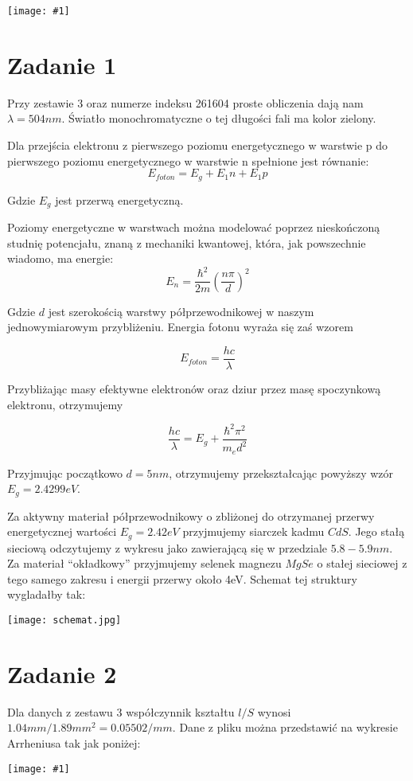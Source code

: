 \documentclass[11pt]{article}
\newcommand{\largepng}[1]{\begin{center}\texttt{[image: \#1]}\end{center}}
\begin{document}
\largepng{tabelka.png}
\section{Zadanie 1}

Przy zestawie 3 oraz numerze indeksu 261604 proste obliczenia dają nam $\lambda=504 nm$. Światło monochromatyczne o tej długości
 fali ma kolor zielony.

Dla przejścia elektronu z pierwszego poziomu energetycznego w warstwie p do pierwszego poziomu energetycznego w warstwie n spełnione
 jest równanie:
\[E_{foton} = E_g + E_1n + E_1p\]

Gdzie $E_g$ jest przerwą energetyczną.

Poziomy energetyczne w warstwach można modelować poprzez nieskończoną studnię potencjału, znaną z mechaniki kwantowej, która,
 jak powszechnie wiadomo, ma energie:
\[E_n = \frac{\hbar^2}{2m} (\frac{n \pi}{d})^2 \]

Gdzie $d$ jest szerokością warstwy półprzewodnikowej w naszym jednowymiarowym przybliżeniu. Energia fotonu wyraża się zaś wzorem

\[E_{foton} = \frac{hc}{\lambda} \]

Przybliżając masy efektywne elektronów oraz dziur przez masę spoczynkową elektronu, otrzymujemy

\[ \frac{hc}{\lambda} = E_g + \frac{\hbar^2 \pi^2}{m_e d^2} \]

Przyjmując początkowo $d=5nm$, otrzymujemy przekształcając powyższy wzór $E_g=2.4299 eV$.

Za aktywny materiał półprzewodnikowy o zbliżonej do otrzymanej przerwy energetycznej wartości $E_g=2.42eV$
przyjmujemy siarczek kadmu $CdS$. Jego stałą sieciową odczytujemy z wykresu jako zawierającą się w przedziale $5.8-5.9 nm$.
Za materiał ``okładkowy'' przyjmujemy selenek magnezu $MgSe$ o stałej sieciowej z tego samego zakresu i energii przerwy około 4eV.
Schemat tej struktury wygladałby tak:

\begin{center}\texttt{[image: schemat.jpg]}\end{center}
\section{Zadanie 2}

Dla danych z zestawu 3 współczynnik kształtu $l/S$ wynosi $1.04mm/1.89mm^2 = 0.05502/mm$.
Dane z pliku można przedstawić na wykresie Arrheniusa tak jak poniżej:
\largepng{z2.png}
\end{document}
